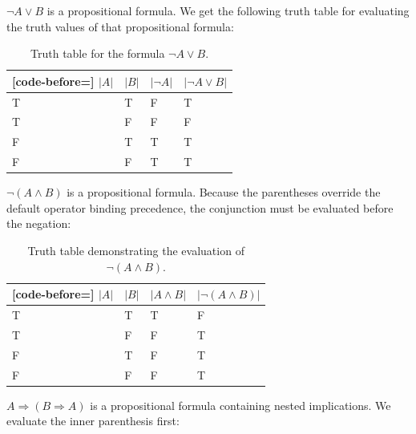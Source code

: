 \begin{examples}
    \begin{exampleenumerate}
        \item\label{example:logic:disjunction_equals_implication} $\lnot A \lor B$ is a propositional formula. We get the following truth table for evaluating the truth values of that propositional formula:
        
        \begin{table}[ht]
        \centering
        \begin{NiceTabularX}{.6\textwidth}{X[c]|X[c]|X[c]|X[2,c]}[code-before=]
            $|A|$ & $|B|$ & $|\lnot A|$ & $|\lnot A \lor B|$\\
            \hline
            T & T & F & T \\
            T & F & F & F \\
            F & T & T & T \\
            F & F & T & T \\
        \end{NiceTabularX}
        \caption{Truth table for the formula $\lnot A \lor B$.}\label{table:logic:disjunction_equals_implication}
        \end{table}

        \item\label{example:logic:negation_of_conjunction} $\lnot(A \land B)$ is a propositional formula. Because the parentheses override the default operator binding precedence, the conjunction must be evaluated before the negation:
        
        \begin{table}[ht]
        \centering
        \begin{NiceTabularX}{.6\textwidth}{X[c]|X[c]|X[c]|X[2,c]}[code-before=]
            $|A|$ & $|B|$ & $|A \land B|$ & $|\lnot(A \land B)|$\\
            \hline
            T & T & T & F \\
            T & F & F & T \\
            F & T & F & T \\
            F & F & F & T \\
        \end{NiceTabularX}
        \caption{Truth table demonstrating the evaluation of $\lnot(A \land B)$.}\label{table:logic:negated_conjunction}
        \end{table}

        \item\label{example:logic:implication_of_implication} $A \Rightarrow (B \Rightarrow A)$ is a propositional formula containing nested implications. We evaluate the inner parenthesis first:
        

\end{exampleenumerate}
\end{examples}
